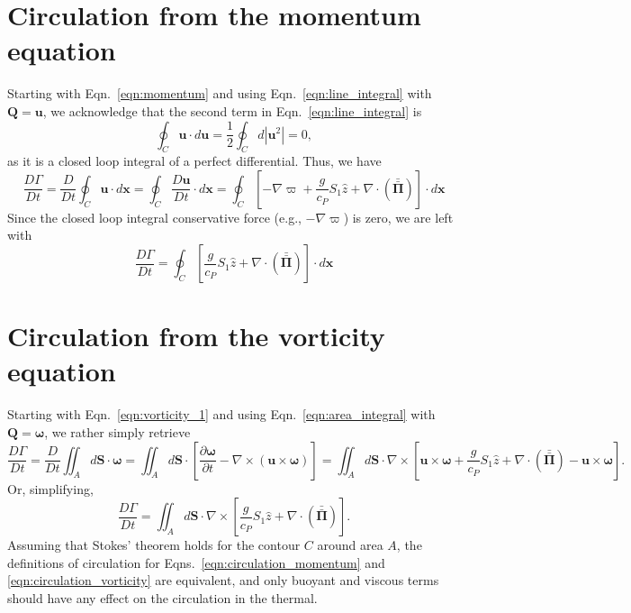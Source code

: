 \documentclass[onecolumn, amsmath, amsfonts, amssymb]{aastex62}
\newcommand{\Div}[1]{\ensuremath{\nabla\cdot\left( #1\right)}}
\newcommand{\grad}{\ensuremath{\nabla}}
\newcommand{\stressT}{\ensuremath{\bm{\bar{\bar{\Pi}}}}}
\begin{document}
\section{Circulation from the momentum equation}
Starting with Eqn.~\ref{eqn:momentum} and using Eqn.~\ref{eqn:line_integral} with $\bm{Q} = \bm{u}$,
we acknowledge that the second term in Eqn.~\ref{eqn:line_integral} is
\begin{equation}
\oint_C \bm{u}\cdot d\bm{u} = \frac{1}{2} \oint_C d|\bm{u}^2| = 0,
\end{equation}
as it is a closed loop integral of a perfect differential. Thus, we have
\begin{equation}
\frac{D \Gamma}{D t} = \frac{D}{Dt} \oint_C \bm{u}\cdot d\bm{x} = \oint_C \frac{D\bm{u}}{Dt}\cdot d\bm{x}
= \oint_C \left[-\grad\varpi + \frac{g}{c_P} S_1 \hat{z} + \Div{\stressT}  \right]\cdot d\bm{x}
\end{equation}
Since the closed loop integral conservative force (e.g., $-\grad\varpi$) is zero, we are left
with
\begin{equation}
\frac{D \Gamma}{D t} 
= \oint_C \left[\frac{g}{c_P} S_1 \hat{z} + \Div{\stressT}  \right]\cdot d\bm{x}
\label{eqn:circulation_momentum}
\end{equation}

\section{Circulation from the vorticity equation}
Starting with Eqn.~\ref{eqn:vorticity_1} and using Eqn.~\ref{eqn:area_integral} with
$\bm{Q} = \bm{\omega}$, we rather simply retrieve
\begin{equation}
\frac{D \Gamma}{Dt} = \frac{D}{Dt}\iint_A d\bm{S}\cdot\bm{\omega}
= \iint_A d\bm{S} \cdot\left[\frac{\partial \bm{\omega}}{\partial t} - \grad\times(\bm{u}\times\bm{\omega})\right]
= \iint_A d\bm{S} \cdot\grad\times\left[\bm{u}\times\bm{\omega} + \frac{g}{c_P}S_1 \hat{z} + \Div{\stressT} - \bm{u}\times\bm{\omega}\right].
\end{equation}
Or, simplifying,
\begin{equation}
\frac{D \Gamma}{Dt} 
= \iint_A d\bm{S} \cdot\grad\times\left[\frac{g}{c_P}S_1 \hat{z} + \Div{\stressT}\right].
\label{eqn:circulation_vorticity}
\end{equation}
Assuming that Stokes' theorem holds for the contour $C$ around area $A$, the definitions
of circulation for Eqns.~\ref{eqn:circulation_momentum} and \ref{eqn:circulation_vorticity}
are equivalent, and only buoyant and viscous terms should have any effect on the circulation
in the thermal.



\end{document}
